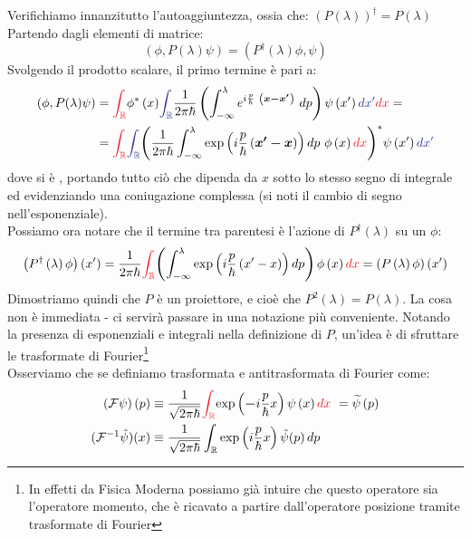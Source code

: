 \documentclass[../../FisicaTeorica.tex]{subfiles}
\begin{document}
Verifichiamo innanzitutto l'autoaggiuntezza, ossia che: $\left(P\left(\lambda\right)\right)^\dag=P\left(\lambda\right)$
Partendo dagli elementi di matrice:
\[
\left(\phi,P\left(\lambda\right)\psi\right)=\left(P^\dag\left(\lambda\right)\phi,\psi\right)
\]
Svolgendo il prodotto scalare, il primo termine è pari a:
\begin{align*}
(\phi, P(\lambda)\psi) &= \textcolor{Red}{\int_{\bb{R}}}{\phi^*\left(x\right)}
\textcolor{Blue}{\int_{\bb{R}}}{\frac{1}{2\pi\hbar}\left(\int_{-\infty}^{\lambda}{e^{i\frac{p}{\hbar}\ \left(\bm{x-x'}\right)}\ }dp\right)\psi\left(x'\right)\textcolor{Blue}{dx'} \textcolor{Red}{d x}}=\\
&={\textcolor{Red}{\int_{\bb{R}}} \textcolor{Blue}{\int_{\bb{R}}} {\left(\frac{1}{2\pi\hbar}\int_{-\infty}^{\lambda}{\exp\left({i\frac{p}{\hbar}\left(\bm{x'-x}\right)}\right )dp\ \phi\left(x\right)\textcolor{Red}{dx}}\right)}}^*\psi \left(x'\right)\textcolor{Blue}{dx'}
\end{align*}
dove si è , portando tutto ciò che dipenda da $x$ sotto lo stesso segno di integrale ed evidenziando una coniugazione complessa (si noti il cambio di segno nell'esponenziale).\\
Possiamo ora notare che il termine tra parentesi è l'azione di $P^\dag (\lambda)$ su un $\phi$:
\begin{align*}
    \left(P^\dag\left(\lambda\right)\phi\right)\left(x'\right)=\frac{1}{2\pi\hbar}\textcolor{Red}{\int_{\bb{R}}}{\left(\int_{-\infty}^{\lambda}{\exp\left ({i\frac{p}{\hbar}\left(x'-x\right)}\right )dp}\right)\phi\left(x\right)\textcolor{Red}{dx}=\left(P\left(\lambda\right)\phi\right)(x')}
\end{align*}
Dimostriamo quindi che $P$ è un proiettore, e cioè che $P^2\left(\lambda\right)=P\left(\lambda\right)$. La cosa non è immediata - ci servirà passare in una notazione più conveniente. Notando la presenza di esponenziali e integrali nella definizione di $P$, un'idea è di sfruttare le trasformate di Fourier\footnote{In effetti da Fisica Moderna possiamo già intuire che questo operatore sia l'operatore momento, che è ricavato a partire dall'operatore posizione tramite trasformate di Fourier}\\
Osserviamo che se definiamo trasformata e antitrasformata di Fourier come:
\begin{align*}
\left(\mathcal{F}\psi\right)\left(p\right)&\equiv\frac{1}{\sqrt{2\pi\hbar}}\textcolor{Red}{\int_{\bb{R}}}
{\exp\left (\bm{-}{i\frac{p}{\hbar}x}\right )\psi\left(x\right)\textcolor{Red}{dx}\ } = \widetilde{\psi}\left(p\right)\\
(\mathcal{F}^{-1}\tilde{\psi})(x) &\equiv  \frac{1}{\sqrt{2\pi\hbar}}\int_\bb{R} \exp\left(i\frac{p}{\hbar}x\right) \tilde{\psi}(p)\, dp
\end{align*}
\end{document}
